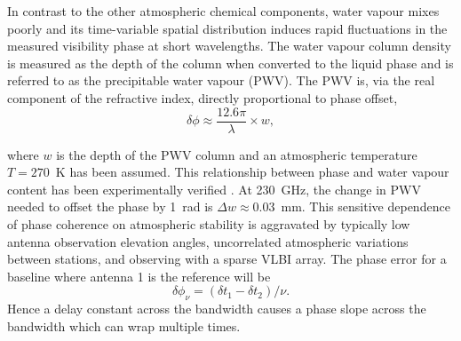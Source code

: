 In contrast to the other atmospheric chemical components, water vapour mixes poorly and its time-variable spatial distribution induces rapid fluctuations in the measured visibility phase at short wavelengths. The water vapour column density is measured as the depth of the column when converted to the liquid phase and is referred to as the precipitable water vapour (PWV). The PWV is, via the real component of the refractive index, directly proportional to phase offset, 
\begin{equation}
\delta\phi \approx \frac{12.6\pi}{\lambda} \times w, 
\end{equation}\label{eq:phi-pwv}

\noindent where $w$ is the depth of the PWV column \citep*{Carilli_1999} and an atmospheric temperature $T=270$~K has been assumed. This relationship between phase and water vapour content has been experimentally verified \citep{hogg_1981}. At 230~GHz, the change in PWV needed to offset the phase by 1~rad is $\Delta w\approx0.03$~mm. This sensitive dependence of phase coherence on atmospheric stability is aggravated by typically low antenna observation elevation angles, uncorrelated atmospheric variations between stations, and observing with a sparse VLBI array.
The phase error for a baseline where antenna 1 is the reference will be
\begin{equation}
\delta \phi_\nu = (\delta t_1 - \delta t_2)/\nu.
\end{equation}
Hence a delay constant across the bandwidth causes a phase slope across the bandwidth which can wrap multiple times.


